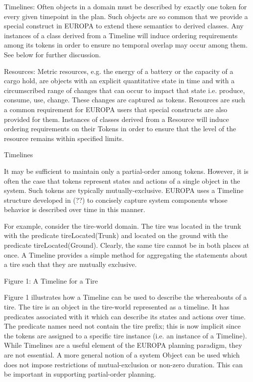 Timelines: Often objects in a domain must be described by exactly one
token for every given timepoint in the plan. Such objects are so
common that we provide a special construct in EUROPA to extend these
semantics to derived classes. Any instances of a class derived from a
Timeline will induce ordering requirements among its tokens in order
to ensure no temporal overlap may occur among them. See below for
further discussion.

Resources: Metric resources, e.g. the energy of a battery or the
capacity of a cargo hold, are objects with an explicit quantitative
state in time and with a circumscribed range of changes that can occur
to impact that state i.e. produce, consume, use, change. These changes
are captured as tokens. Resources are such a common requirement for
EUROPA users that special constructs are also provided for
them. Instances of classes derived from a Resource will induce
ordering requirements on their Tokens in order to ensure that the
level of the resource remains within specified limits.

Timelines

It may be sufficient to maintain only a partial-order among
tokens. However, it is often the case that tokens represent states and
actions of a single object in the system. Such tokens are typically
mutually-exclusive. EUROPA uses a Timeline structure developed in (??)
to concisely capture system components whose behavior is described
over time in this manner.

For example, consider the tire-world domain. The tire was located in
the trunk with the predicate tireLocated(Trunk) and located on the
ground with the predicate tireLocated(Ground). Clearly, the same tire
cannot be in both places at once. A Timeline provides a simple method
for aggregating the statements about a tire such that they are
mutually exclusive.

Figure 1: A Timeline for a Tire

Figure 1 illustrates how a Timeline can be used to describe the
whereabouts of a tire. The tire is an object in the tire-world
represented as a timeline. It has predicates associated with it which
can describe its states and actions over time. The predicate names
need not contain the tire prefix; this is now implicit since the
tokens are assigned to a specific tire instance (i.e. an instance of a
Timeline). While Timelines are a useful element of the EUROPA planning
paradigm, they are not essential. A more general notion of a system
Object can be used which does not impose restrictions of
mutual-exclusion or non-zero duration. This can be important in
supporting partial-order planning.

